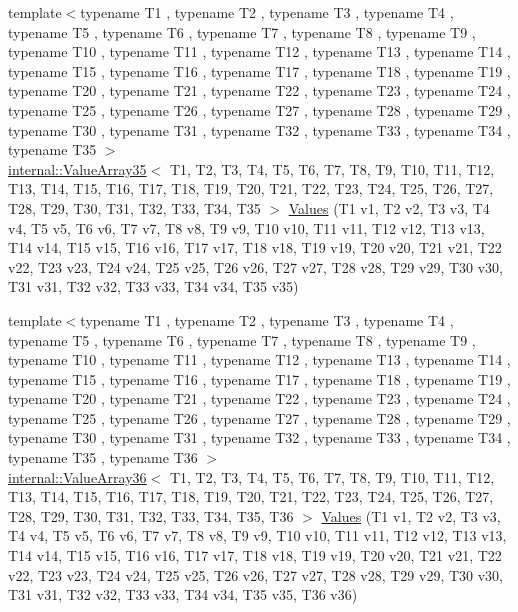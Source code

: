 \begin{DoxyCompactItemize}
{\footnotesize template$<$typename T1 , typename T2 , typename T3 , typename T4 , typename T5 , typename T6 , typename T7 , typename T8 , typename T9 , typename T10 , typename T11 , typename T12 , typename T13 , typename T14 , typename T15 , typename T16 , typename T17 , typename T18 , typename T19 , typename T20 , typename T21 , typename T22 , typename T23 , typename T24 , typename T25 , typename T26 , typename T27 , typename T28 , typename T29 , typename T30 , typename T31 , typename T32 , typename T33 , typename T34 , typename T35 $>$ }\\\mbox{\hyperlink{classtesting_1_1internal_1_1ValueArray35}{internal\+::\+Value\+Array35}}$<$ T1, T2, T3, T4, T5, T6, T7, T8, T9, T10, T11, T12, T13, T14, T15, T16, T17, T18, T19, T20, T21, T22, T23, T24, T25, T26, T27, T28, T29, T30, T31, T32, T33, T34, T35 $>$ \mbox{\hyperlink{namespacetesting_a8746425c9d27e46ea5bc5fd77586bc2a}{Values}} (T1 v1, T2 v2, T3 v3, T4 v4, T5 v5, T6 v6, T7 v7, T8 v8, T9 v9, T10 v10, T11 v11, T12 v12, T13 v13, T14 v14, T15 v15, T16 v16, T17 v17, T18 v18, T19 v19, T20 v20, T21 v21, T22 v22, T23 v23, T24 v24, T25 v25, T26 v26, T27 v27, T28 v28, T29 v29, T30 v30, T31 v31, T32 v32, T33 v33, T34 v34, T35 v35)
\item 
{\footnotesize template$<$typename T1 , typename T2 , typename T3 , typename T4 , typename T5 , typename T6 , typename T7 , typename T8 , typename T9 , typename T10 , typename T11 , typename T12 , typename T13 , typename T14 , typename T15 , typename T16 , typename T17 , typename T18 , typename T19 , typename T20 , typename T21 , typename T22 , typename T23 , typename T24 , typename T25 , typename T26 , typename T27 , typename T28 , typename T29 , typename T30 , typename T31 , typename T32 , typename T33 , typename T34 , typename T35 , typename T36 $>$ }\\\mbox{\hyperlink{classtesting_1_1internal_1_1ValueArray36}{internal\+::\+Value\+Array36}}$<$ T1, T2, T3, T4, T5, T6, T7, T8, T9, T10, T11, T12, T13, T14, T15, T16, T17, T18, T19, T20, T21, T22, T23, T24, T25, T26, T27, T28, T29, T30, T31, T32, T33, T34, T35, T36 $>$ \mbox{\hyperlink{namespacetesting_ae5d25537f4919c9e82d02c45af4c7c5f}{Values}} (T1 v1, T2 v2, T3 v3, T4 v4, T5 v5, T6 v6, T7 v7, T8 v8, T9 v9, T10 v10, T11 v11, T12 v12, T13 v13, T14 v14, T15 v15, T16 v16, T17 v17, T18 v18, T19 v19, T20 v20, T21 v21, T22 v22, T23 v23, T24 v24, T25 v25, T26 v26, T27 v27, T28 v28, T29 v29, T30 v30, T31 v31, T32 v32, T33 v33, T34 v34, T35 v35, T36 v36)
\item 

\end{DoxyCompactItemize}
